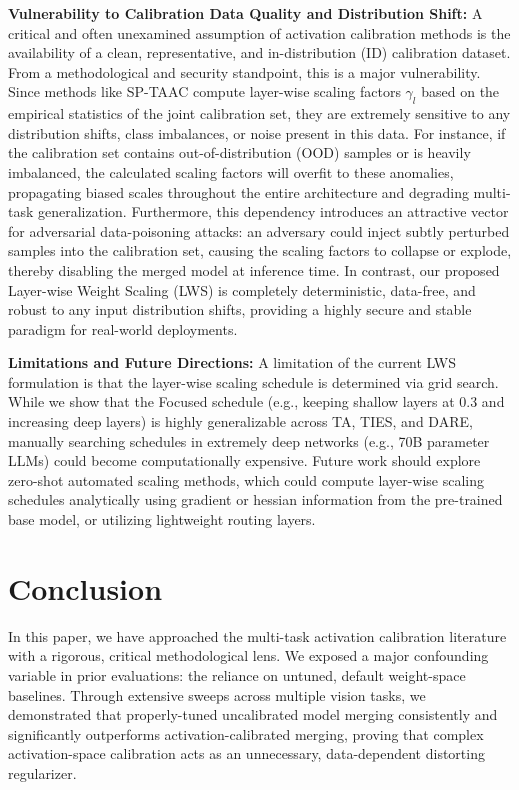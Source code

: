 \documentclass{article}
\theoremstyle{plain}
\theoremstyle{definition}
\theoremstyle{remark}
\begin{document}
\textbf{Vulnerability to Calibration Data Quality and Distribution Shift:}
A critical and often unexamined assumption of activation calibration methods is the availability of a clean, representative, and in-distribution (ID) calibration dataset. From a methodological and security standpoint, this is a major vulnerability. Since methods like SP-TAAC compute layer-wise scaling factors $\gamma_l$ based on the empirical statistics of the joint calibration set, they are extremely sensitive to any distribution shifts, class imbalances, or noise present in this data. For instance, if the calibration set contains out-of-distribution (OOD) samples or is heavily imbalanced, the calculated scaling factors will overfit to these anomalies, propagating biased scales throughout the entire architecture and degrading multi-task generalization. Furthermore, this dependency introduces an attractive vector for adversarial data-poisoning attacks: an adversary could inject subtly perturbed samples into the calibration set, causing the scaling factors to collapse or explode, thereby disabling the merged model at inference time. In contrast, our proposed Layer-wise Weight Scaling (LWS) is completely deterministic, data-free, and robust to any input distribution shifts, providing a highly secure and stable paradigm for real-world deployments.

\textbf{Limitations and Future Directions:}
A limitation of the current LWS formulation is that the layer-wise scaling schedule is determined via grid search. While we show that the Focused schedule (e.g., keeping shallow layers at 0.3 and increasing deep layers) is highly generalizable across TA, TIES, and DARE, manually searching schedules in extremely deep networks (e.g., 70B parameter LLMs) could become computationally expensive. Future work should explore zero-shot automated scaling methods, which could compute layer-wise scaling schedules analytically using gradient or hessian information from the pre-trained base model, or utilizing lightweight routing layers.

\section{Conclusion}
\label{sec:conclusion}

In this paper, we have approached the multi-task activation calibration literature with a rigorous, critical methodological lens. We exposed a major confounding variable in prior evaluations: the reliance on untuned, default weight-space baselines. Through extensive sweeps across multiple vision tasks, we demonstrated that properly-tuned uncalibrated model merging consistently and significantly outperforms activation-calibrated merging, proving that complex activation-space calibration acts as an unnecessary, data-dependent distorting regularizer.
\end{document}
